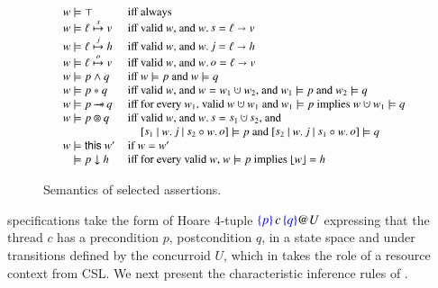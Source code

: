 \begin{figure}[t]

\[
{\small
\begin{array}[t]{ll}
w \models \top & \mbox{iff always}\\
w \models \hlabel \spts v & \mbox{iff valid $w$, and $w.\mathself = \hlabel \hpts v$}\\ 
w \models \hlabel \jpts h & \mbox{iff valid $w$, and $w.\mathjoint = \hlabel \hpts h$}\\
w \models \hlabel \opts v & \mbox{iff valid $w$, and $w.\mathother = \hlabel \hpts v$}\\
w \models p \aand q & \mbox{iff $w \models p$ and $w \models q$}\\
w \models p \lsep q & \mbox{iff valid $w$, and $w = w_1 \hunion w_2$, and $w_1 \models p$ and $w_2 \models q$}\\
w \models p \wand q & \mbox{iff for every $w_1$, valid $w \hunion w_1$ and $w_1 \models p$ implies $w \hunion w_1 \models q$}\\
w \models p \ssep q & \mbox{iff valid $w$, and $w.\mathself= \mathself_1 \hunion \mathself_2$, and}\\
 & \hphantom{\mbox{iff}}\ \mbox{$\state{\mathself_1}{w.\mathjoint}{{\mathself_2} \zip {w.\mathother}}
   \models p$ and $\state{\mathself_2}{w.\mathjoint}{{\mathself_1} \zip
   {w.\mathother}} \models q$}\\
w \models \mathsf{this}\ w' & \mbox{if $w = w'$}\\
\hphantom{w} \models p \downarrow h & \mbox{iff for every valid $w$, $w
  \models p$ implies $\flatten w = h$}
\end{array}}
\]
\caption{Semantics of selected \SCST assertions. }
\label{fig:broccoli}
\end{figure}

\SCST specifications take the form of Hoare 4-tuple
$\textcolor{blue}{\left\{ p \right\}}\, c \, \textcolor{blue}{\left\{ q \right\}}@{U}$ expressing that the thread $c$ has a
precondition $p$, postcondition $q$, in a state space and under
transitions defined by the concurroid $U$, which in \SCST takes the
role of a resource context from CSL. We next present the
characteristic inference rules of \SCST.

\vspace{4pt}

